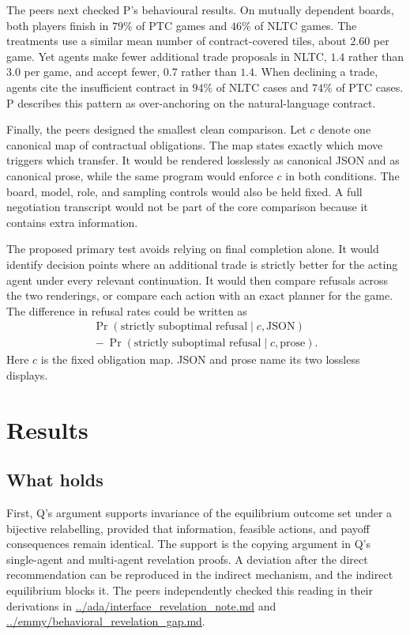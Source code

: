 \documentclass{article}
\begin{document}
The peers next checked P's behavioural results.  On mutually dependent boards, both players finish in \(79\%\) of PTC games and \(46\%\) of NLTC games.  The treatments use a similar mean number of contract-covered tiles, about \(2.60\) per game.  Yet agents make fewer additional trade proposals in NLTC, \(1.4\) rather than \(3.0\) per game, and accept fewer, \(0.7\) rather than \(1.4\).  When declining a trade, agents cite the insufficient contract in \(94\%\) of NLTC cases and \(74\%\) of PTC cases.  P describes this pattern as over-anchoring on the natural-language contract.

Finally, the peers designed the smallest clean comparison.  Let \(c\) denote one canonical map of contractual obligations.  The map states exactly which move triggers which transfer.  It would be rendered losslessly as canonical JSON and as canonical prose, while the same program would enforce \(c\) in both conditions.  The board, model, role, and sampling controls would also be held fixed.  A full negotiation transcript would not be part of the core comparison because it contains extra information.

The proposed primary test avoids relying on final completion alone.  It would identify decision points where an additional trade is strictly better for the acting agent under every relevant continuation.  It would then compare refusals across the two renderings, or compare each action with an exact planner for the game.  The difference in refusal rates could be written as
\begin{multline*}
 \Pr(\text{strictly suboptimal refusal}\mid c,\text{JSON}) \\
 {}-\Pr(\text{strictly suboptimal refusal}\mid c,\text{prose}).
\end{multline*}
Here \(c\) is the fixed obligation map.  JSON and prose name its two lossless displays.

\section{Results}

\subsection*{What holds}

First, Q's argument supports invariance of the equilibrium outcome set under a bijective relabelling, provided that information, feasible actions, and payoff consequences remain identical.  The support is the copying argument in Q's single-agent and multi-agent revelation proofs.  A deviation after the direct recommendation can be reproduced in the indirect mechanism, and the indirect equilibrium blocks it.  The peers independently checked this reading in their derivations in \url{../ada/interface_revelation_note.md} and \url{../emmy/behavioral_revelation_gap.md}.
\end{document}
